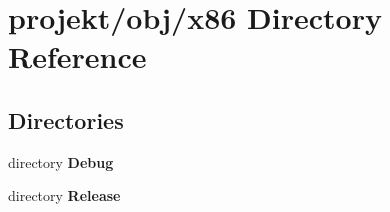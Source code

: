 \section{projekt/obj/x86 Directory Reference}
\label{dir_b0d8d91858a012e53b65ced3bb2b9365}
\subsection*{Directories}
\begin{DoxyCompactItemize}
\item 
directory \textbf{ Debug}
\item 
directory \textbf{ Release}
\end{DoxyCompactItemize}
